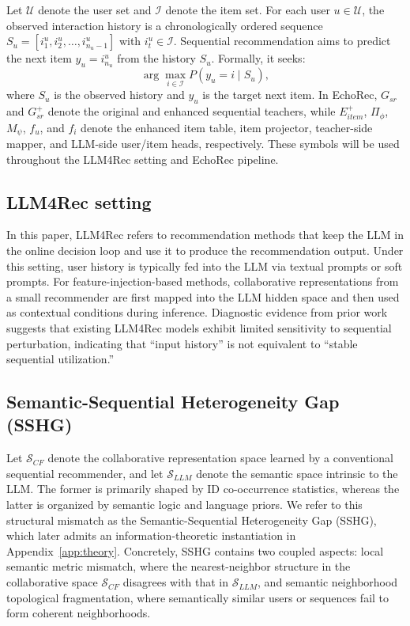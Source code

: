 ﻿\documentclass{article}
\begin{document}
Let $\mathcal{U}$ denote the user set and $\mathcal{I}$ denote the item set. For each user $u\in\mathcal{U}$, the observed interaction history is a chronologically ordered sequence $S_u=[i_1^u,i_2^u,\dots,i_{n_u-1}^u]$ with $i_t^u\in\mathcal{I}$. Sequential recommendation aims to predict the next item $y_u=i_{n_u}^u$ from the history $S_u$. Formally, it seeks:
\begin{equation}
\arg\max_{i \in \mathcal{I}} P(y_u=i \mid S_u),
\end{equation}
where $S_u$ is the observed history and $y_u$ is the target next item. In EchoRec, $G_{sr}$ and $G_{sr}^{+}$ denote the original and enhanced sequential teachers, while $E_{item}^{+}$, $\Pi_{\phi}$, $M_{\psi}$, $f_u$, and $f_i$ denote the enhanced item table, item projector, teacher-side mapper, and LLM-side user/item heads, respectively. These symbols will be used throughout the LLM4Rec setting and EchoRec pipeline.

\subsection{LLM4Rec setting}

In this paper, LLM4Rec refers to recommendation methods that keep the LLM in the online decision loop and use it to produce the recommendation output. Under this setting, user history is typically fed into the LLM via textual prompts or soft prompts. For feature-injection-based methods, collaborative representations from a small recommender are first mapped into the LLM hidden space and then used as contextual conditions during inference. Diagnostic evidence from prior work~\cite{kim2025lost} suggests that existing LLM4Rec models exhibit limited sensitivity to sequential perturbation, indicating that ``input history'' is not equivalent to ``stable sequential utilization.''

\subsection{Semantic-Sequential Heterogeneity Gap (SSHG)}

Let $\mathcal{S}_{CF}$ denote the collaborative representation space learned by a conventional sequential recommender, and let $\mathcal{S}_{LLM}$ denote the semantic space intrinsic to the LLM. The former is primarily shaped by ID co-occurrence statistics, whereas the latter is organized by semantic logic and language priors. We refer to this structural mismatch as the Semantic-Sequential Heterogeneity Gap (SSHG), which later admits an information-theoretic instantiation in Appendix~\ref{app:theory}. Concretely, SSHG contains two coupled aspects: local semantic metric mismatch, where the nearest-neighbor structure in the collaborative space $\mathcal{S}_{CF}$ disagrees with that in $\mathcal{S}_{LLM}$, and semantic neighborhood topological fragmentation, where semantically similar users or sequences fail to form coherent neighborhoods.
\end{document}
